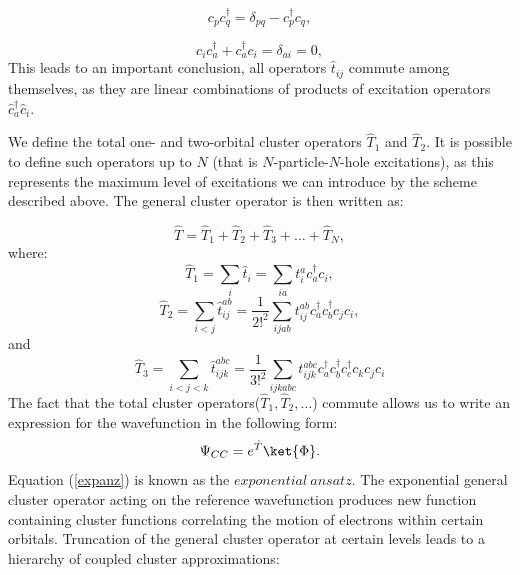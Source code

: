 \documentclass[twoside,english]{uiofysmaster}
\begin{document}
\[
c_p c_q^\dag = \delta_{pq} - c_p^\dag c_q,
\]

\[
c_ic_a^\dag + c_a^\dag c_i = \delta_{ai} = 0,
\]
This leads to an important conclusion, all operators $\hat{t}_{ij}$
commute among themselves, as they are linear combinations of products
of excitation operators $\hat{c}_a^\dagger \hat{c}_i$.


We define the total one- and two-orbital cluster operators $\hat{T}_1$
and $\hat{T}_2$. It is possible to define such operators up to $N$ (that is $N$-particle-$N$-hole excitations), as
this represents the maximum level of excitations we can introduce by the
scheme described above. The general cluster operator is then written
as:

\[
\hat{T} = \hat{T}_1 + \hat{T}_2 +\hat{T}_3 + \dots + \hat{T}_N,
\]
where:
\[ 
\hat{T}_1 = \sum_{i}\hat{t}_i = \sum_{ia}t_{i}^{a} c^\dag_{a}  c_{i},
\] 
\[ 
\hat{T}_2 = \sum_{i<j}\hat{t}_{ij}^{ab} = \frac{1}{2!^2}\sum_{ijab}t_{ij}^{ab} c^\dag_{a} c^\dag_{b} c_{j} c_{i}, 
\]
and
\[ 
\hat{T}_3 = \sum_{i<j<k}\hat{t}_{ijk}^{abc} = \frac{1}{3!^2}\sum_{ijkabc}t_{ijk}^{abc} c^\dag_{a} c^\dag_{b} c^\dag_{c} c_{k}c_{j} c_{i} 
\]
The fact that the total cluster operators($\hat{T}_1, \hat{T}_2, \dots$) commute allows us to write an expression for the wavefunction in the following form:
\begin{equation}\label{expanz}
\Psi_{CC} =  e^{\hat{T}}\ket{\Phi}.
\end{equation}
Equation (\ref{expanz}) is known as the $exponential\ ansatz$. The
exponential general cluster operator acting on the reference
wavefunction produces new function containing cluster functions
correlating the motion of electrons within certain orbitals.
Truncation of the general cluster operator at certain levels leads to
a hierarchy of coupled cluster approximations:
\end{document}
